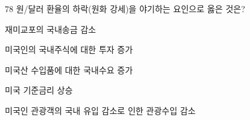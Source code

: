 \begin{question}{78}
원/달러 환율의 하락(원화 강세)을 야기하는 요인으로 옳은 것은?
\begin{choices}
  \item 재미교포의 국내송금 감소
  \item 미국인의 국내주식에 대한 투자 증가
  \item 미국산 수입품에 대한 국내수요 증가
  \item 미국 기준금리 상승
  \item 미국인 관광객의 국내 유입 감소로 인한 관광수입 감소
\end{choices}
\end{question}
